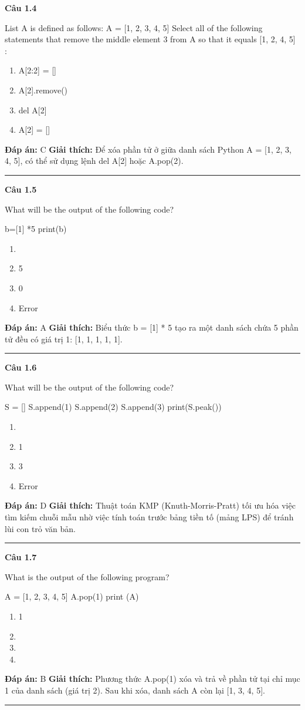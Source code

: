 \documentclass[11pt,a4paper]{article}
\newenvironment{question}[1]{%
  \par\vspace{1em}\noindent\textbf{\large Câu #1}\par\vspace{0.4em}
}{%
  \par\vspace{1em}\hrule\vspace{0.6em}
}
\newenvironment{choices}{%
  \begin{enumerate}[label=\textbf{\Alph*.},leftmargin=2.2em,itemsep=2pt,topsep=3pt]
}{%
  \end{enumerate}
}
\newcommand{\choice}{\item}
\newenvironment{codebox}{%
  \begin{tcolorbox}[colback=gray!8!white,colframe=gray!50!black,arc=1.5mm,boxrule=0.6pt,left=3mm,right=3mm,top=2.5mm,bottom=2.5mm]
  \ttfamily\small
}{%
  \end{tcolorbox}
}
\begin{document}
\begin{question}{1.4}
List A is defined as follows: A = [1, 2, 3, 4, 5] Select all of the following statements that remove the middle element 3 from A so that it equals [1, 2, 4, 5] :
\begin{choices}
\choice A[2:2] = []
\choice A[2].remove()
\choice del A[2]
\choice A[2] = []
\end{choices}
\textbf{Đáp án:} C
\textbf{Giải thích:} Để xóa phần tử ở giữa danh sách Python A = [1, 2, 3, 4, 5], có thể sử dụng lệnh del A[2] hoặc A.pop(2).
\end{question}

\begin{question}{1.5}
What will be the output of the following code?
\begin{codebox}
b=[1] *5
print(b)
\end{codebox}
\begin{choices}
\choice [1, 1, 1, 1, 1]
\choice 5
\choice 0
\choice Error
\end{choices}
\textbf{Đáp án:} A
\textbf{Giải thích:} Biểu thức b = [1] * 5 tạo ra một danh sách chứa 5 phần tử đều có giá trị 1: [1, 1, 1, 1, 1].
\end{question}

\begin{question}{1.6}
What will be the output of the following code?
\begin{codebox}
S = []
S.append(1)
S.append(2)
S.append(3)
print(S.peak())
\end{codebox}
\begin{choices}
\choice [1,2,3]
\choice 1
\choice 3
\choice Error
\end{choices}
\textbf{Đáp án:} D
\textbf{Giải thích:} Thuật toán KMP (Knuth-Morris-Pratt) tối ưu hóa việc tìm kiếm chuỗi mẫu nhờ việc tính toán trước bảng tiền tố (mảng LPS) để tránh lùi con trỏ văn bản.
\end{question}

\begin{question}{1.7}
What is the output of the following program?
\begin{codebox}
A = [1, 2, 3, 4, 5]
A.pop(1)
print (A)
\end{codebox}
\begin{choices}
\choice 1
\choice [1, 3, 4, 5]
\choice [2, 3, 4, 5]
\choice [1, 2, 3, 4, 5]
\end{choices}
\textbf{Đáp án:} B
\textbf{Giải thích:} Phương thức A.pop(1) xóa và trả về phần tử tại chỉ mục 1 của danh sách (giá trị 2). Sau khi xóa, danh sách A còn lại [1, 3, 4, 5].
\end{question}
\end{document}

